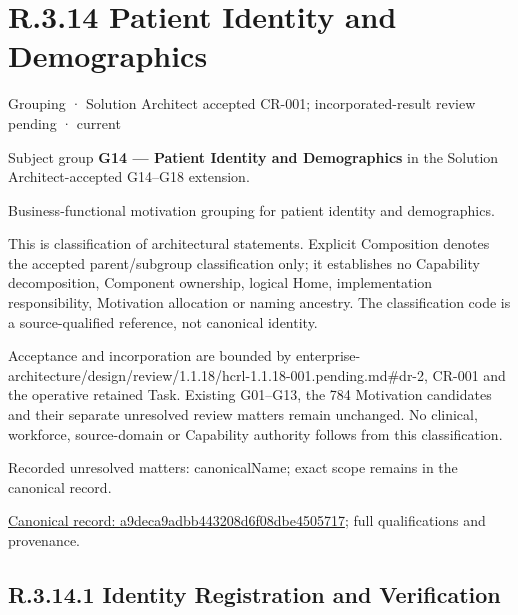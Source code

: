 \section*{R.3.14 Patient Identity and Demographics}
\label{navigation:R.3.14}

\label{element:a9deca9adbb443208d6f08dbe4505717}
{\small Grouping · Solution Architect accepted CR-001; incorporated-result review pending · current}\par

Subject group \textbf{G14 — Patient Identity and Demographics} in the Solution Architect-accepted G14–G18 extension.



Business-functional motivation grouping for patient identity and demographics.



This is classification of architectural statements. Explicit Composition denotes the accepted parent/subgroup classification only; it establishes no Capability decomposition, Component ownership, logical Home, implementation responsibility, Motivation allocation or naming ancestry. The classification code is a source-qualified reference, not canonical identity.



Acceptance and incorporation are bounded by enterprise-architecture/design/review/1.1.18/hcrl-1.1.18-001.pending.md\#dr-2, CR-001 and the operative retained Task. Existing G01–G13, the 784 Motivation candidates and their separate unresolved review matters remain unchanged. No clinical, workforce, source-domain or Capability authority follows from this classification.


{\small Recorded unresolved matters: canonicalName; exact scope remains in the canonical record.}\par
{\footnotesize \href{../../../../continuum/grouping/a9deca9adbb443208d6f08dbe4505717.md}{Canonical record: a9deca9adbb443208d6f08dbe4505717}; full qualifications and provenance.}\par
\subsection*{R.3.14.1 Identity Registration and Verification}
\label{navigation:R.3.14.1}

